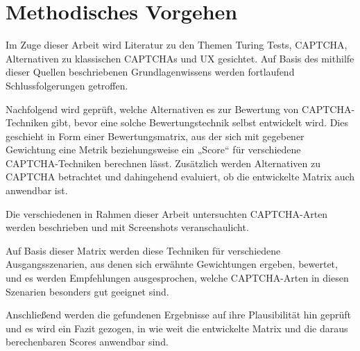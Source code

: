 \chapter{Methodisches Vorgehen}
Im Zuge dieser Arbeit wird Literatur zu den Themen Turing Tests, CAPTCHA, Alternativen zu klassischen CAPTCHAs und UX gesichtet.
Auf Basis des mithilfe dieser Quellen beschriebenen Grundlagenwissens werden fortlaufend Schlussfolgerungen getroffen. 

Nachfolgend wird geprüft, welche Alternativen es zur Bewertung von CAPTCHA-Techniken gibt, bevor eine solche Bewertungstechnik selbst entwickelt wird. 
Dies geschieht in Form einer Bewertungsmatrix, aus der sich mit gegebener Gewichtung eine Metrik beziehungsweise ein „Score“ für verschiedene CAPTCHA-Techniken berechnen lässt. 
Zusätzlich werden Alternativen zu CAPTCHA betrachtet und dahingehend evaluiert, ob die entwickelte Matrix auch anwendbar ist.

Die verschiedenen in Rahmen dieser Arbeit untersuchten CAPTCHA-Arten werden beschrieben und mit Screenshots veranschaulicht.

Auf Basis dieser Matrix werden diese Techniken für verschiedene Ausgangsszenarien, 
aus denen sich erwähnte Gewichtungen ergeben, bewertet, und es werden Empfehlungen ausgesprochen,
welche CAPTCHA-Arten in diesen Szenarien besonders gut geeignet sind.

Anschließend werden die gefundenen Ergebnisse auf ihre Plausibilität hin geprüft und es wird ein Fazit gezogen, 
in wie weit die entwickelte Matrix und die daraus berechenbaren Scores anwendbar sind.
  
